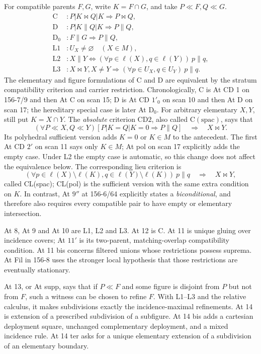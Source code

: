 \begin{definition}
\label{SA21-B-optional-list}
For compatible parents \(F,G\), write \(K=F\cap G\), and take
\(P\ll F,Q\ll G\).
\begin{align*}
 \mathrm C &: P|K\bowtie Q|K\Longrightarrow P\bowtie Q,\\
 \mathrm D &: P|K\parallel Q|K\Longrightarrow P\parallel Q,\\
 \mathrm D_0 &: F\parallel G\Longrightarrow P\parallel Q,\\
 \mathrm L1 &: U_X\ne\varnothing\quad(X\in M),\\
 \mathrm L2 &: X\parallel Y\Longleftrightarrow
                (\forall p\in\ell(X),q\in\ell(Y))\ p\parallel q,\\
 \mathrm L3 &: X\bowtie Y, X\ne Y\Longrightarrow
                (\forall p\in U_X,q\in U_Y)\ p\parallel q.
\end{align*}
The elementary and figure formulations of C and D are equivalent by
the stratum compatibility criterion and carrier restriction.
Chronologically, C is At CD 1 on 156-7/9 and then At C on scan 15;
D is At CD \(1'_0\) on scan 10 and then At D on scan 17;
the hereditary special case is later At D\(_0\).
For arbitrary elementary \(X,Y\), still put \(K=X\cap Y\).
The \emph{absolute} criterion \(\mathrm{CD2}\), also called
\(\mathrm C(\mathrm{spac})\), says that
\[
 (\forall P\ll X,Q\ll Y)
 [P|K=Q|K=0\Longrightarrow P\parallel Q]
 \quad\Longrightarrow\quad X\bowtie Y.              \tag{B.A}
\]
Its polyhedral sufficient version adds \(K=0\) or \(K\in M\) to the
antecedent. The first At CD \(2'\) on scan 11 says only \(K\in M\);
At pol on scan 17 explicitly adds the empty case. Under L2 the empty
case is automatic, so this change does not affect the equivalence below.
The corresponding lieu criterion is
\[
 (\forall p\in\ell(X)\setminus\ell(K),
          q\in\ell(Y)\setminus\ell(K))\ p\parallel q
 \quad\Longrightarrow\quad X\bowtie Y,              \tag{B.CL}
\]
called CL(spac); CL(pol) is the sufficient version with the same extra
condition on \(K\). In contrast, At \(9''\) at 156-6/64 explicitly
states a \emph{biconditional}, and therefore also requires every
compatible pair to have empty or elementary intersection.

At 8, At 9 and At 10 are L1, L2 and L3. At 12 is C.
At 11 is unique gluing over incidence covers; At \(11'\) is its
two-parent, matching-overlap compatibility condition. At 11 bis
concerns filtered unions whose restrictions possess suprema.
At Fil in 156-8 uses the stronger local hypothesis that those
restrictions are eventually stationary.

At 13, or At supp, says that if \(P\ll F\) and some figure is disjoint
from \(P\) but not from \(F\), such a witness can be chosen to refine
\(F\). With L1--L3 and the relative calculus, it makes subdivisions
exactly the incidence-maximal refinements. At 14 is extension of a
prescribed subdivision of a subfigure. At 14 bis adds a cartesian
deployment square, unchanged complementary deployment, and a mixed
incidence rule. At 14 ter asks for a unique elementary extension of
a subdivision of an elementary boundary.
\end{definition}

